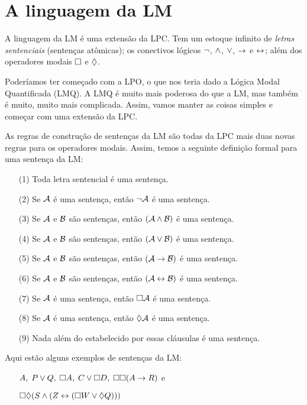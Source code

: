 \section{A linguagem da LM}
\label{TFLtoML}


A linguagem da LM é uma extensão da LPC. Tem um estoque infinito de \emph{letras sentenciais} (sentenças atômicas); os conectivos lógicos $\neg$, $\wedge$,  $\vee$,    $\rightarrow$  e $\leftrightarrow$; além dos  operadores modais  $\Box$ e $\Diamond$.

Poderíamos ter começado com a LPO, o que nos teria dado a Lógica Modal Quantificada (LMQ). A LMQ é muito mais poderosa do que a LM, mas também é muito, muito mais complicada. Assim,  vamos manter as coisas simples e começar com uma extensão da LPC. 

As regras de construção de  sentenças da LM são todas da LPC mais duas novas regras para os operadores modais. Assim, temos a seguinte definição formal para uma sentença da LM:
 
\begin{itemize}
	\item[(1)]Toda letra sentencial é uma sentença. 
	\item[(2)]Se $\mathcal{A}$ é uma sentença, então $\neg\mathcal{A}$ é uma sentença. 
	\item[(3)]Se $\mathcal{A}$ e $\mathcal{B}$ são sentenças, então $(\mathcal{A}\wedge\mathcal{B})$ é uma sentença.
	\item[(4)]Se $\mathcal{A}$ e $\mathcal{B}$ são sentenças, então $(\mathcal{A}\vee\mathcal{B})$ é uma sentença.
	\item[(5)]Se $\mathcal{A}$ e $\mathcal{B}$ são sentenças, então $(\mathcal{A}\rightarrow\mathcal{B})$ é uma sentença.
	\item[(6)]Se $\mathcal{A}$ e $\mathcal{B}$ são sentenças, então $(\mathcal{A}\leftrightarrow\mathcal{B})$ é uma sentença.
	\item[(7)]Se $\mathcal{A}$ é uma sentença, então $\Box\mathcal{A}$ é uma sentença.
	\item[(8)]Se $\mathcal{A}$ é uma sentença, então $\Diamond\mathcal{A}$ é uma sentença.
	\item[(9)]Nada além do estabelecido por essas cláusulas é uma sentença. 
\end{itemize}
Aqui estão alguns exemplos de sentenças  da LM:
\begin{itemize}
	\item[]$A,\;P\vee Q,\;\Box A,\;C\vee \Box D,\;\Box\Box (A\rightarrow R)$ e 
	\item[]$\Box\Diamond (S\wedge (Z\leftrightarrow (\Box W \vee \Diamond Q)))$
\end{itemize}

